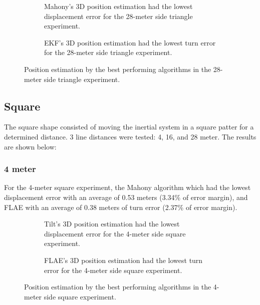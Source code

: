 \begin{figure}[H]
    \centering
    \begin{subfigure}{0.49\textwidth}
        \centering
        \resizebox{1\linewidth}{!}{}
        \caption{Mahony's 3D position estimation had the lowest displacement error for the 28-meter side triangle experiment.}
        \label{fig:triangle28_2D}
    \end{subfigure}
    \begin{subfigure}{0.49\textwidth}
        \centering
        \resizebox{1\linewidth}{!}{}
        \caption{EKF's 3D position estimation had the lowest turn error for the 28-meter side triangle experiment.}
        \label{fig:triangle28_3D}
    \end{subfigure}
    \caption{Position estimation by the best performing algorithms in the 28-meter side triangle experiment.}
    \label{fig:triangle28}
\end{figure}

\subsection{Square}

The square shape consisted of moving the inertial system in a square patter for a determined distance. 3 line distances were tested: 4, 16, and 28 meter. The results are shown below:

\subsubsection{4 meter}

For the 4-meter square experiment, the Mahony algorithm which had the lowest displacement error with an average of 0.53 meters (3.34\% of error margin), and FLAE with an average of 0.38 meters of turn error (2.37\% of error margin).

\vspace{-0.5cm}

\vspace{-1.5cm}

\begin{figure}[H]
    \centering
    \begin{subfigure}{0.49\textwidth}
        \centering
        \resizebox{1\linewidth}{!}{}
        \caption{Tilt's 3D position estimation had the lowest displacement error for the 4-meter side square experiment.}

        \label{fig:square42D}
    \end{subfigure}
    \begin{subfigure}{0.49\textwidth}
        \centering
        \resizebox{1\linewidth}{!}{}
        \caption{FLAE's 3D position estimation had the lowest turn error for the 4-meter  side square experiment.}
        \label{fig:square43D}
    \end{subfigure}
    \caption{Position estimation by the best performing algorithms in the 4-meter side square experiment.}
    \label{fig:square4}
\end{figure}

